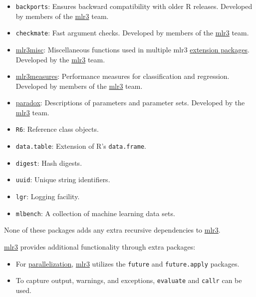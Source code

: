 \documentclass[
  11pt,
  parskip=half,
  DIV=calc,
  BCOR=10mm,
  x11names]{scrbook}
\providecommand{\tightlist}{%
  \setlength{\itemsep}{0pt}\setlength{\parskip}{0pt}}
\begin{document}
\begin{itemize}
\tightlist
\item
  \texttt{backports}:
  Ensures backward compatibility with older R releases. Developed by members of the \href{https://mlr3.mlr-org.com}{mlr3} team.
\item
  \texttt{checkmate}:
  Fast argument checks. Developed by members of the \href{https://mlr3.mlr-org.com}{mlr3} team.
\item
  \href{https://mlr3misc.mlr-org.com}{mlr3misc}:
  Miscellaneous functions used in multiple mlr3 \href{https://github.com/mlr-org/mlr3/wiki/Extension-Packages}{extension packages}.
  Developed by the \href{https://mlr3.mlr-org.com}{mlr3} team.
\item
  \href{https://mlr3measures.mlr-org.com}{mlr3measures}:
  Performance measures for classification and regression. Developed by members of the \href{https://mlr3.mlr-org.com}{mlr3} team.
\item
  \href{https://paradox.mlr-org.com}{paradox}:
  Descriptions of parameters and parameter sets. Developed by the \href{https://mlr3.mlr-org.com}{mlr3} team.
\item
  \texttt{R6}:
  Reference class objects.
\item
  \texttt{data.table}:
  Extension of R's \texttt{data.frame}.
\item
  \texttt{digest}:
  Hash digests.
\item
  \texttt{uuid}:
  Unique string identifiers.
\item
  \texttt{lgr}:
  Logging facility.
\item
  \texttt{mlbench}:
  A collection of machine learning data sets.
\end{itemize}

None of these packages adds any extra recursive dependencies to \href{https://mlr3.mlr-org.com}{mlr3}.

\href{https://mlr3.mlr-org.com}{mlr3} provides additional functionality through extra packages:

\begin{itemize}
\tightlist
\item
  For \protect\hyperlink{parallelization}{parallelization}, \href{https://mlr3.mlr-org.com}{mlr3} utilizes the \texttt{future} and \texttt{future.apply} packages.
\item
  To capture output, warnings, and exceptions, \texttt{evaluate} and \texttt{callr} can be used.
\end{itemize}
\end{document}
